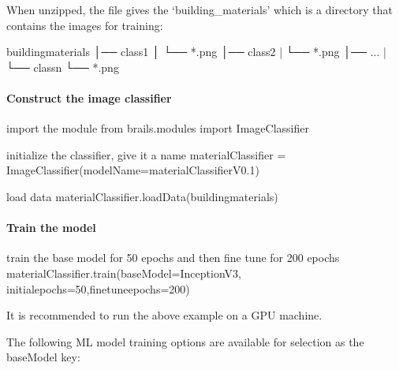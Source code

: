 \documentclass[letterpaper,10pt,english]{sphinxmanual}
\begin{document}
\sphinxAtStartPar
When unzipped, the file gives the ‘building\_materials’ which is a directory that contains the images for training:

\begin{sphinxVerbatim}[commandchars=\\\{\}]
building\PYGZus{}materials
│── class\PYGZus{}1
│       └── *.png
│── class\PYGZus{}2
|      └── *.png
│── ...
|
└── class\PYGZus{}n
       └── *.png
\end{sphinxVerbatim}


\paragraph{Construct the image classifier}
\label{\detokenize{common/user_manual/modules/genericImageClassifier:construct-the-image-classifier}}
\begin{sphinxVerbatim}[commandchars=\\\{\}]
\PYGZsh{} import the module
from brails.modules import ImageClassifier

\PYGZsh{} initialize the classifier, give it a name
materialClassifier = ImageClassifier(modelName=\PYGZsq{}materialClassifierV0.1\PYGZsq{})

\PYGZsh{} load data
materialClassifier.loadData(\PYGZsq{}building\PYGZus{}materials\PYGZsq{})
\end{sphinxVerbatim}


\paragraph{Train the model}
\label{\detokenize{common/user_manual/modules/genericImageClassifier:train-the-model}}
\begin{sphinxVerbatim}[commandchars=\\\{\}]
\PYGZsh{} train the base model for 50 epochs and then fine tune for 200 epochs
materialClassifier.train(baseModel=\PYGZsq{}InceptionV3\PYGZsq{}, initial\PYGZus{}epochs=50,fine\PYGZus{}tune\PYGZus{}epochs=200)
\end{sphinxVerbatim}

\sphinxAtStartPar
It is recommended to run the above example on a GPU machine.

\sphinxAtStartPar
The following ML model training options are available for selection as the baseModel key:
\end{document}
